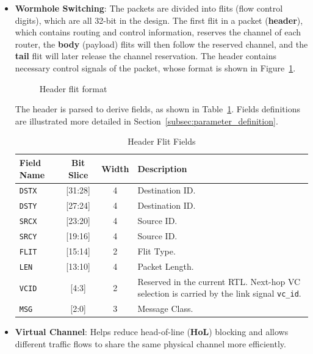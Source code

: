\documentclass[11pt,a4paper]{article}
\begin{document}
\begin{itemize}
    \item \textbf{Wormhole Switching}: The packets are divided into flits (flow control digits), which are all 32-bit in the design. The first flit in a packet (\textbf{header}), which contains routing and control information, reserves the channel of each router, the \textbf{body} (payload) flits will then follow the reserved channel, and the \textbf{tail} flit will later release the channel reservation. The header contains necessary control signals of the packet, whose format is shown in Figure~\ref{fig:header}.
\begin{figure}[htbp]
    \centering
     
    \caption{Header flit format}
    \label{fig:header}
\end{figure}
    The header is parsed to derive fields, as shown in Table~\ref{tab:headflit}. Fields definitions are illustrated more detailed in Section~\ref{subsec:parameter_definition}.

\begin{table}[htbp]
\centering
\caption{Header Flit Fields}
\label{tab:headflit}
\begin{tabular}{@{}lccl@{}}
\toprule
\textbf{Field Name} & \textbf{Bit Slice} & \textbf{Width} & \textbf{Description} \\ \midrule
\texttt{DSTX}        & [31:28]      & 4        & Destination ID. \\
\texttt{DSTY}        & [27:24]      & 4        & Destination ID. \\
\texttt{SRCX}        & [23:20]      & 4        & Source ID. \\
\texttt{SRCY}        & [19:16]      & 4        & Source ID. \\
\texttt{FLIT}        & [15:14]      & 2        & Flit Type. \\
\texttt{LEN}         & [13:10]      & 4        & Packet Length. \\
\texttt{VCID}        & [4:3]        & 2        & Reserved in the current RTL. Next-hop VC selection is carried by the link signal \texttt{vc\_id}. \\
\texttt{MSG}         & [2:0]        & 3        & Message Class.\\
\bottomrule
\end{tabular}
\end{table}


    \item \textbf{Virtual Channel}: Helps reduce head-of-line (\textbf{HoL}) blocking and allows different traffic flows to share the same physical channel more efficiently.

\end{itemize}    
\end{document}
